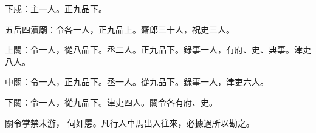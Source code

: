 \begin{pinyinscope}
 下戍：主一人。正九品下。



 五岳四瀆廟：令各一人，正九品上。齋郎三十人，祝史三人。



 上關：令一人，從八品下。丞二人。正九品下。錄事一人，有府、史、典事。津吏八人。



 中關：令一人，正九品下。丞一人。從九品下。錄事一人，津吏六人。



 下關：令一人，從九品下。津吏四人。關令各有府、史。



 關令掌禁末游，
 伺奸慝。凡行人車馬出入往來，必據過所以勘之。



\end{pinyinscope}